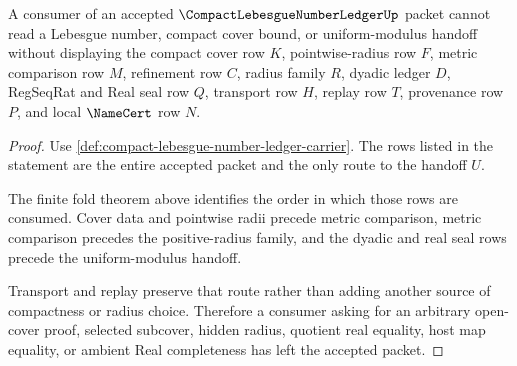 \begin{theorem}
\label{thm:compact-lebesgue-number-ledger-nonescape}
A consumer of an accepted $\CompactLebesgueNumberLedgerUp$ packet cannot read a Lebesgue number, compact cover bound, or uniform-modulus handoff without displaying the compact cover row $K$, pointwise-radius row $F$, metric comparison row $M$, refinement row $C$, radius family $R$, dyadic ledger $D$, RegSeqRat and Real seal row $Q$, transport row $H$, replay row $T$, provenance row $P$, and local $\NameCert$ row $N$.
\end{theorem}
\begin{proof}
Use \autoref{def:compact-lebesgue-number-ledger-carrier}. The rows listed in the statement are the entire accepted packet and the only route to the handoff $U$.

The finite fold theorem above identifies the order in which those rows are consumed. Cover data and pointwise radii precede metric comparison, metric comparison precedes the positive-radius family, and the dyadic and real seal rows precede the uniform-modulus handoff.

Transport and replay preserve that route rather than adding another source of compactness or radius choice. Therefore a consumer asking for an arbitrary open-cover proof, selected subcover, hidden radius, quotient real equality, host map equality, or ambient Real completeness has left the accepted packet.
\end{proof}




